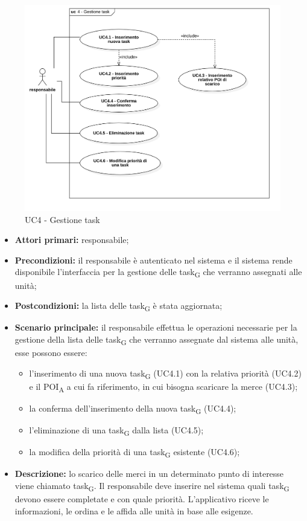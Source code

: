 \begin{figure}[H]
	\centering
	\includegraphics[scale=0.52]{res/images/uc4.png}
	\caption{UC4 - Gestione task}
\end{figure}

\begin{itemize}
	\item 	\textbf{Attori primari:} responsabile;
	\item 	\textbf{Precondizioni:} il responsabile è autenticato nel sistema e il sistema rende disponibile l'interfaccia per la gestione delle task\textsubscript{G} che verranno assegnati alle unità;
	\item 	\textbf{Postcondizioni:} la lista delle task\textsubscript{G} è stata aggiornata;
	\item 	\textbf{Scenario principale:} il responsabile effettua le operazioni necessarie per la gestione della lista delle task\textsubscript{G} che verranno assegnate dal sistema alle unità, esse possono essere:
	\begin{itemize}
		\item l'inserimento di una nuova task\textsubscript{G} (UC4.1) con la relativa priorità (UC4.2) e il POI\textsubscript{A} a cui fa riferimento, in cui bisogna scaricare la merce (UC4.3);
		\item la conferma dell'inserimento della nuova task\textsubscript{G} (UC4.4);
		\item l'eliminazione di una task\textsubscript{G} dalla lista (UC4.5);
		\item la modifica della priorità di una task\textsubscript{G} esistente (UC4.6);
	\end{itemize}
	\item 	\textbf{Descrizione:} lo scarico delle merci in un determinato punto di interesse viene chiamato task\textsubscript{G}. Il responsabile deve inserire nel sistema quali task\textsubscript{G} devono essere completate e con quale priorità. L'applicativo riceve le informazioni, le ordina e le affida alle unità in base alle esigenze. 

\end{itemize}

